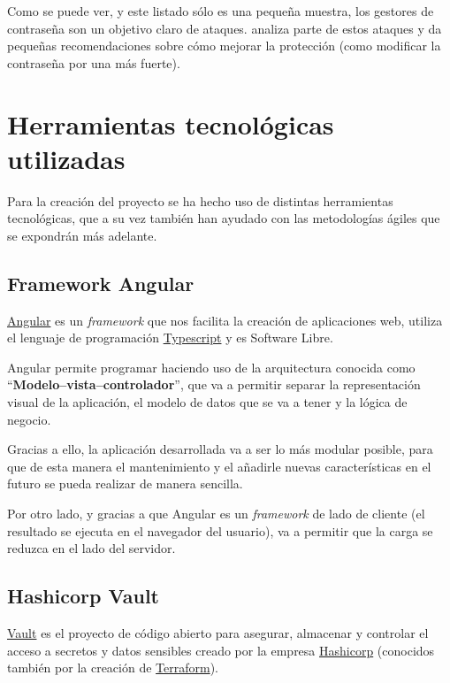 \documentclass{\ClassPath/viu-tfm-template}
\begin{document}
Como se puede ver, y este listado sólo es una pequeña muestra, los gestores de contraseña son un objetivo claro de ataques.  \textcite{hacked3} analiza parte de estos ataques y da pequeñas recomendaciones sobre cómo mejorar la protección (como modificar la contraseña por una más fuerte).


\section{Herramientas tecnológicas utilizadas}

Para la creación del proyecto se ha hecho uso de distintas herramientas tecnológicas, que a su vez también han ayudado con las metodologías ágiles que se expondrán más adelante.


\subsection{Framework Angular}

\href{https://angular.io/}{Angular} es un \textit{framework} que nos facilita la creación de aplicaciones web, utiliza el lenguaje de programación \href{https://www.typescriptlang.org/}{Typescript} y es Software Libre.

Angular permite programar haciendo uso de la arquitectura conocida como “\textbf{Modelo–vista–controlador}”, que  va a permitir separar la representación visual de la aplicación, el modelo de datos que se va a tener y la lógica de negocio.

Gracias a ello, la aplicación desarrollada va a ser lo más modular posible, para que de esta manera el mantenimiento y el añadirle nuevas características en el futuro se pueda realizar de manera sencilla.

Por otro lado, y gracias a que Angular es un \textit{framework} de lado de cliente (el resultado se ejecuta en el navegador del usuario), va a permitir que la carga se reduzca en el lado del servidor.

\subsection{Hashicorp Vault}

\href{https://www.vaultproject.io/}{Vault} es el proyecto de código abierto para asegurar, almacenar y controlar el acceso a secretos y datos sensibles creado por la empresa \href{https://www.hashicorp.com/}{Hashicorp} (conocidos también por la creación de \href{https://www.terraform.io/}{Terraform}).
\end{document}
